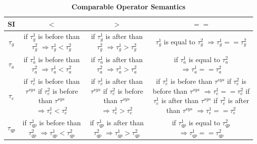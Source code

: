 \begin{table}[!htbp]
	\centering
	\caption{\textbf{Comparable Operator Semantics}}
	\label{tab:cos}
	\begin{tabular}{|c|c|c|c|} \hline
		SI & $<$ & $>$ & $==$ \\ \hline
        $\tau_{g}$ & \makecell{if $\tau^{1}_{g}$ is before than $\tau^{2}_{g}$ \\ $\Rightarrow \tau^{1}_{g} < \tau^{2}_{g}$} & \makecell{if $\tau^{1}_{g}$ is after than $\tau^{2}_{g}$ \\ $\Rightarrow \tau^{1}_{g} > \tau^{2}_{g}$} & \makecell{$\tau^{1}_{g}$ is equal to $\tau^{2}_{g}$ \\ $\Rightarrow \tau^{1}_{g} == \tau^{2}_{g}$} \\ \hhline{|=#=|=|=|}
		$\tau_{a}$ & \makecell{if $\tau^{1}_{a}$ is before than $\tau^{2}_{a}$ \\ $\Rightarrow \tau^{1}_{a} < \tau^{2}_{a}$} & \makecell{if $\tau^{1}_{a}$ is after than $\tau^{2}_{a}$ \\$\Rightarrow \tau^{1}_{a} > \tau^{2}_{a}$} & \makecell{if $\tau^{1}_{a}$ is equal to $\tau^{2}_{a}$ \\$\Rightarrow \tau^{1}_{a} == \tau^{2}_{a}$} \\ \hline
		$\tau_{e}$ & \makecell{if $\tau^{1}_{e}$ is before than $\tau^{sys}$ \\ if $\tau^{2}_{e}$ is before than $\tau^{sys}$ \\$\Rightarrow \tau^{1}_{e} < \tau^{2}_{e}$}& \makecell{if $\tau^{1}_{e}$ is after than $\tau^{sys}$ \\ if $\tau^{2}_{e}$ is before than $\tau^{sys}$\\$\Rightarrow \tau^{1}_{e} > \tau^{2}_{e}$} & \makecell{if $\tau^{1}_{e}$ is before than $\tau^{sys}$ \\ if $\tau^{2}_{e}$ is before than $\tau^{sys}$ \\ $\Rightarrow \tau^{1}_{e} == \tau^{2}_{e}$ \\if $\tau^{1}_{e}$ is after than $\tau^{sys}$\\if $\tau^{2}_{e}$ is after than $\tau^{sys}$\\$\Rightarrow \tau^{1}_{e} == \tau^{2}_{e}$} \\ \hline
        $\tau_{qp}$ & \makecell{if $\tau^{1}_{qp}$ is before than $\tau^{2}_{qp}$\\ $\Rightarrow \tau^{1}_{qp} < \tau^{2}_{qp}$} & \makecell{if $\tau^{1}_{qp}$ is after than $\tau^{2}_{qp}$ \\ $\Rightarrow \tau^{1}_{qp} > \tau^{2}_{qp}$} & \makecell{if $\tau^{1}_{qp}$ is equal to $\tau^{2}_{qp}$ \\ $\Rightarrow \tau^{1}_{qp} == \tau^{2}_{qp}$} \\ \hline

\end{tabular}
\end{table}
